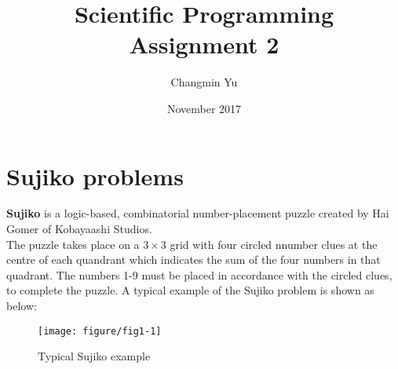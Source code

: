\documentclass[12pt]{article}\usepackage[]{graphicx}\usepackage[]{color}
\newenvironment{knitrout}{}{} %
\begin{document}
\title{Scientific Programming Assignment 2}
\author{Changmin Yu}

\date{November 2017}
\maketitle

\section{Sujiko problems}
\textbf{Sujiko} is a logic-based, combinatorial number-placement puzzle created by Hai Gomer of Kobayaashi Studios.\\
The puzzle takes place on a $3\times 3$ grid with four circled nnumber clues at the centre of each quandrant which indicates the sum of the four numbers in that quadrant. The numbers 1-9 must be placed in accordance with the circled clues, to complete the puzzle. A typical example of the Sujiko problem is shown as below:


\begin{figure}[ht]
\begin{center}
\begin{knitrout}
\color{fgcolor}
\texttt{[image: figure/fig1-1]} 

\end{knitrout}
\end{center}
\caption{Typical Sujiko example}
\label{fig:one}
\end{figure}
\end{document}
